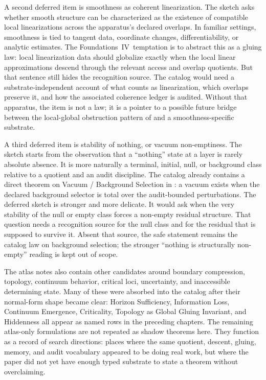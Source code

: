 \documentclass[11pt]{article}
\newcommand{\FIV}{Foundations~IV}
\theoremstyle{definition}
\begin{document}
A second deferred item is smoothness as coherent linearization. The
sketch asks whether smooth structure can be characterized as the
existence of compatible local linearizations across the apparatus's
declared overlaps. In familiar settings, smoothness is tied to tangent
data, coordinate changes, differentiability, or analytic estimates. The
\FIV\ temptation is to abstract this as a gluing law: local
linearization data should globalize exactly when the local linear
approximations descend through the relevant access and overlap
quotients. But that sentence still hides the recognition source. The
catalog would need a substrate-independent account of what counts as
linearization, which overlaps preserve it, and how the associated
coherence ledger is audited. Without that apparatus, the item is not a
law; it is a pointer to a possible future bridge between the local-global
obstruction pattern of  and a
smoothness-specific substrate.

A third deferred item is stability of nothing, or vacuum non-emptiness.
The sketch starts from the observation that a ``nothing'' state at a
layer is rarely absolute absence. It is more naturally a terminal,
initial, null, or background class relative to a quotient and an audit
discipline. The catalog already contains a direct theorem on
Vacuum / Background Selection in
: a vacuum exists when the
declared background selector is total over the audit-bounded
perturbations. The deferred sketch is stronger and more delicate. It
would ask when the very stability of the null or empty class forces a
non-empty residual structure. That question needs a recognition source
for the null class and for the residual that is supposed to survive it.
Absent that source, the safe statement remains the catalog law on
background selection; the stronger ``nothing is structurally non-empty''
reading is kept out of scope.

The atlas notes also contain other candidates around boundary
compression, topology, continuum behavior, critical loci, uncertainty,
and inaccessible determining state. Many of these were absorbed into
the catalog after their normal-form shape became clear: Horizon
Sufficiency, Information Loss, Continuum Emergence, Criticality,
Topology as Global Gluing Invariant, and Hiddenness all appear as named
rows in the preceding chapters. The remaining atlas-only formulations
are not repeated as shadow theorems here. They function as a record of
search directions: places where the same quotient, descent, gluing,
memory, and audit vocabulary appeared to be doing real work, but where
the paper did not yet have enough typed substrate to state a theorem
without overclaiming.
\end{document}
